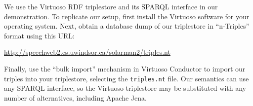 \documentclass[../main.tex]{subfiles}
\begin{document}
We use the Virtuoso RDF triplestore and its SPARQL interface\cite{virtuoso} in our demonstration.  To replicate our setup,
first install the Virtuoso software for your operating system.  Next, obtain a database dump of our triplestore
in ``n-Triples'' format\cite{w3cntriples} using this URL:

\url{http://speechweb2.cs.uwindsor.ca/solarman2/triples.nt}

Finally, use the ``bulk import'' mechanism in Virtuoso Conductor to import our triples into your triplestore, selecting the \texttt{triples.nt} file.
Our semantics can use any SPARQL interface, so the Virtuoso triplestore may be substituted with any number of alternatives, including Apache Jena\cite{jena2013apache}. 
\end{document}
